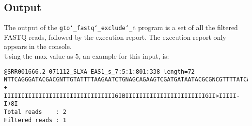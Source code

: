 \subsection*{Output}
The output of the \texttt{gto\char`_fastq\char`_exclude\char`_n} program is a set of all the filtered FASTQ reads, followed by the execution report.
The execution report only appears in the console.\\
Using the max value as 5, an example for this input, is: 
\begin{lstlisting}
@SRR001666.2 071112_SLXA-EAS1_s_7:5:1:801:338 length=72
NTTCAGGGATACGACGNTTGTATTTTAAGAATCTGNAGCAGAAGTCGATGATAATACGCGNCGTTTTATCAN
+
IIIIIIIIIIIIIIIIIIIIIIIIIIIIIIII6IBIIIIIIIIIIIIIIIIIIIIIIIGII>IIIII-I)8I
Total reads    : 2
Filtered reads : 1
\end{lstlisting}
